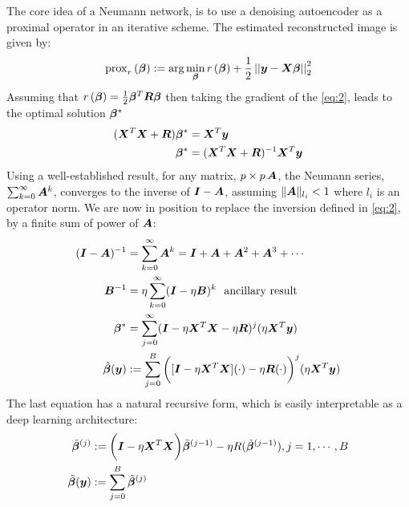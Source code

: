 \documentclass{article}
\begin{document}
The core idea of a Neumann network, is to use a denoising autoencoder as a proximal operator in an iterative scheme.
The estimated reconstructed image is given by:
\begin{equation}
\operatorname{prox}_{r}\left( \bm{\beta} \right) := \arg \min_{\bm{\beta}} r\left( \bm{\beta} \right)+ \frac{1}{2} \left|\left| \bm{y}-\bm{X}\bm{\beta} \right|\right| _{2}^2  \label{eq:2}
\end{equation}
Assuming that $r\left( \bm{\beta} \right) = \frac{1}{2} \bm{\beta}^T \bm{R} \bm{\beta}$ then taking the gradient of the \eqref{eq:2}, leads to the optimal solution $\bm{\beta}^{\ast}$
\begin{align*}
	(\bm{X}^T \bm{X} + \bm{R}) \bm{\beta}^* &=	\bm{X}^T \bm{y} \\
	\bm{\beta}^* 			&= (\bm{X}^T \bm{X} + \bm{R})^{-1} \bm{X}^T \bm{y} \\
\end{align*}
Using a well-established  result,  for any matrix, $ p \times p \, \bm{A}$, the Neumann series, $\sum_{k=0}^\infty \bm{A}^k$, converges to the inverse of $\bm{I} - \bm{A}$,
assuming $\|\bm{A}\|_{l_i} < 1$ where $l_i$ is an operator norm. We are now in position to replace the inversion defined in  \eqref{eq:2}, by a finite sum of power of $\bm{A}$:
\begin{align*}
	(\bm{I} - \bm{A})^{-1}	&= \sum_{k=0}^{\infty} \bm{A}^k = \bm{I} + \bm{A} + \bm{A}^2 + \bm{A}^3 + \cdots \\ 
	\bm{B}^{-1}			&= \eta  \sum_{k=0}^{\infty}  (\bm{I} - \eta \bm{B})^k \text{~ ancillary result} \\	
	\bm{\beta}^{\ast}		&=  \sum_{j=0}^{\infty} (\bm{I} - \eta \bm{X}^T \bm{X} -\eta \bm{R})^j (\eta \bm{X}^T \bm{y}) \\
	\hat{\bm{\beta}}(\bm{y})  &:=  \sum_{j=0}^{B} \bigg([ \bm{I} - \eta \bm{X}^T \bm{X} ](\cdot) -\eta \bm{R}(\cdot) \bigg)^j (\eta \bm{X}^T \bm{y}) \\	
\end{align*}
The last equation has a natural recursive form, which is easily interpretable as a deep learning architecture:
\begin{align*}
	\tilde{\bm{\beta}}^{(j)} 		&:=	\bigg( \bm{I} - \eta \bm{X}^T \bm{X} \bigg) \tilde{\bm{\beta}}^{(j-1)} - \eta R(\tilde{\bm{\beta}}^{(j-1)}), j=1, \cdots , B \\
	\tilde{\bm{\beta}}(\bm{y})	&:=   \sum_{j=0}^{B} \tilde{\bm{\beta}}^{(j)} \\
\end{align*}
\end{document}
